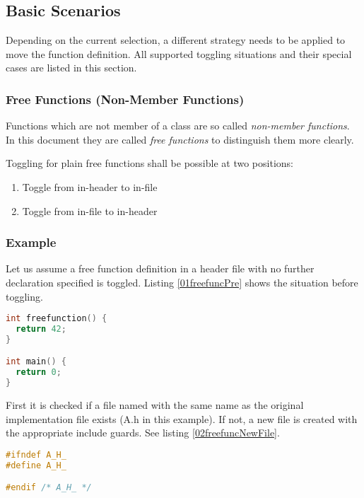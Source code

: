 \subsection{Basic Scenarios}

Depending on the current selection, a different strategy needs to be applied
to move the function definition. All supported toggling situations and their 
special cases are listed in this section.

\subsubsection{Free Functions (Non-Member Functions)}
Functions which are not member of a class are so called \textit{non-member
functions}. In this document they are called \textit{free functions} to
distinguish them more clearly.

Toggling for plain free functions shall be possible at two positions:
\begin{enumerate}
\item Toggle from in-header to in-file
\item Toggle from in-file to in-header
\end{enumerate}

\subsubsection*{Example}
Let us assume a free function definition in a header file with no further
declaration specified is toggled. Listing \nolinebreak\ref{01freefuncPre} shows
the situation before toggling. 

\begin{lstlisting}[caption={A.cpp, initial situation},
label={01freefuncPre},language=C++]
int freefunction() {
  return 42;
}

int main() {
  return 0;
}
\end{lstlisting}

First it is checked if a file named with the same name as the original
implementation file exists (A.h in this example). If not, a new file is created
with the
appropriate include guards. See listing \nolinebreak\ref{02freefuncNewFile}.

\begin{lstlisting}[caption={Newly created A.h}, label={02freefuncNewFile},
language=C++]
#ifndef A_H_
#define A_H_

#endif /* A_H_ */
\end{lstlisting}

